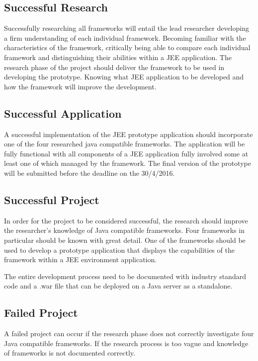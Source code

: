 \documentclass[]{report}
\begin{document}
	\subsection{Successful Research}
	Successfully researching all frameworks will entail the lead researcher developing a firm understanding of each individual framework. Becoming familiar with the characteristics of the framework, critically being able to compare each individual framework and distinguishing their abilities within a JEE application. The research phase of the project should deliver the framework to be used in developing the prototype. Knowing what JEE application to be developed and how the framework will improve the development.
	
	\subsection{Successful Application}
	A successful implementation of the JEE prototype application should incorporate one of the four researched java compatible frameworks. The application will be fully functional with all components of a JEE application fully involved some at least one of which managed by the framework. The final version of the prototype will be submitted before the deadline on the 30/4/2016.
	
	\subsection{Successful Project}
	In order for the project to be considered successful, the research should improve the researcher's knowledge of Java compatible frameworks. Four frameworks in particular should be known with great detail. One of the frameworks should be used to develop a prototype application that displays the capabilities of the framework within a JEE environment application.
	
	The entire development process need to be documented with industry standard code and a .war file that can be deployed on a Java server as a standalone.
	
	\subsection{Failed Project}	
	A failed project can occur if the research phase does not correctly investigate four Java compatible frameworks. If the research process is too vague and knowledge of frameworks is not documented correctly. 
	
\end{document}
